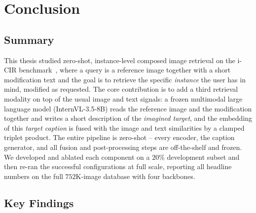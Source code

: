 \chapter{Conclusion}\label{chapt:conclusion}


\section{Summary}\label{sect:concl_summary}

This thesis studied zero-shot, instance-level composed image retrieval on the
i-CIR benchmark~\cite{psomas2025icir}, where a query is a reference image
together with a short modification text and the goal is to retrieve the specific
\emph{instance} the user has in mind, modified as requested. The core
contribution is to add a third retrieval modality on top of the usual image and
text signals: a frozen multimodal large language model (InternVL-3.5-8B) reads
the reference image and the modification together and writes a short description
of the \emph{imagined target}, and the embedding of this \emph{target caption}
is fused with the image and text similarities by a clamped triplet product. The
entire pipeline is zero-shot -- every encoder, the caption generator, and all
fusion and post-processing steps are off-the-shelf and frozen. We developed and
ablated each component on a $20\%$ development subset and then re-ran the
successful configurations at full scale, reporting all headline numbers on the
full $752$K-image database with four backbones.

\section{Key Findings}\label{sect:concl_findings}

